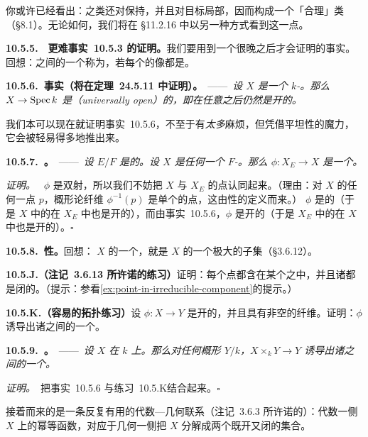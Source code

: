 你或许已经看出：\trUniversallyInjective{}\trMorphism{}之类还对\trComposition{}保持，并且对目标局部，因而构成一个「合理」类（\S8.1）。无论如何，我们将在 \S11.2.16 中以另一种方式看到这一点。

\textbf{10.5.5.}\ \extrahard\ \textbf{更难事实~10.5.3 的证明。}\quad 我们要用到一个很晚之后才会证明的事实。回想：\trTopologicalSpace{}之间的一个\trMap{}称为\textbf{\trOpen\trMap}，若每个\trOpenSet{}的像都是\trOpenSet。

\textbf{10.5.6.\ 事实（将在定理~24.5.11 中证明）。}\ ——\ \emph{设 $X$ 是一个 $k$-\trScheme。那么 $X\to\operatorname{Spec} k$ 是\textbf{\trUniversallyOpen{}}（universally open）的，即在任意\trBaseChange{}之后仍然是开的。}

我们本可以现在就证明事实~10.5.6，不至于有\emph{太多}麻烦，但凭借平坦性的魔力，它会被轻易得多地推出来。

\textbf{10.5.7.\ \trhLemma{}。}\ ——\ \emph{设\trFieldExtension{} $E/F$ 是\trPurelyInseparable{}的。设 $X$ 是任何一个 $F$-\trScheme。那么 $\phi\colon X_E\to X$ 是一个\trHomeomorphism。}

\emph{证明。}\ \trMorphism{} $\phi$ 是双射，所以我们不妨把 $X$ 与 $X_E$ 的点认同起来。（理由：对 $X$ 的任何一点 $p$，概形论纤维 $\phi^{-1}(p)$ 是单个的点，这由\trPurelyInseparable{}性的定义而来。）\trMorphism{} $\phi$ 是\trContinuous{}的（于是 $X$ 中的\trOpenSet{}在 $X_E$ 中也是开的），而由事实~10.5.6，$\phi$ 是开的（于是 $X_E$ 中的\trOpenSet{}在 $X$ 中也是开的）。\hfill$\square$

\textbf{10.5.8.\ \trConnected{}性。}\quad 回想：\trTopologicalSpace{} $X$ 的一个\trConnectedComponent，就是 $X$ 的一个极大的\trConnected{}子集（\S3.6.12）。

\textbf{10.5.J.（注记~3.6.13 所许诺的练习）}\quad 证明：每个点都含在某个\trConnectedComponent{}之中，并且诸\trConnectedComponent{}都是闭的。（提示：参看\cref{ex:point-in-irreducible-component}的提示。）

\textbf{10.5.K.（容易的拓扑练习）}\quad 设 $\phi\colon X\to Y$ 是开的，并且具有非空的\trConnected{}纤维。证明：$\phi$ 诱导出诸\trConnectedComponent{}之间的一个\trBijection。

\textbf{10.5.9.\ \trhLemma{}。}\ ——\ \emph{设 $X$ 在 $k$ 上\trGeometricallyConnected{}。那么对任何概形 $Y/k$，$X\times_k Y\to Y$ 诱导出诸\trConnectedComponent{}之间的一个\trBijection。}

\emph{证明。}\ 把事实~10.5.6 与\mbox{练习~10.5.K}结合起来。\hfill$\square$

接着而来的是一条反复有用的代数—几何联系（注记~3.6.3 所许诺的）：代数一侧 $X$ 上的幂等函数，对应于几何一侧把 $X$ 分解成两个既开又闭的集合。

